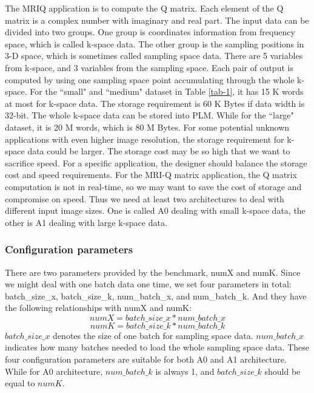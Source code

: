 \documentclass{sig-alternate}
\begin{document}
The MRIQ application is to compute the Q matrix. Each element of the Q matrix is a complex number with imaginary and real part. The input data can be divided into two groups. One group is coordinates information from frequency space, which is called k-space data. The other group is the sampling positions in 3-D space, which is sometimes called sampling space data. There are 5 variables from k-space, and 3 variables from the sampling space. Each pair of output is computed by using one sampling space point accumulating through the whole k-space. For the ``small" and ``medium" dataset in Table \ref{tab-1}, it has 15 K words at most for k-space data. The storage requirement is 60 K Bytes if data width is 32-bit. The whole k-space data can be stored into PLM. While for the ``large" dataset, it is 20 M words, which is 80 M Bytes. For some potential unknown applications with even higher image resolution, the storage requirement for k-space data could be larger. The storage cost may be so high that we want to sacrifice speed. For a specific application, the designer should balance the storage cost and speed requirements. For the MRI-Q matrix application, the Q matrix computation is not in real-time, so we may want to save the cost of storage and compromise on speed. Thus we need at least two architectures to deal with different input image sizes. One is called A0 dealing with small k-space data, the other is A1 dealing with large k-space data.\\



\subsubsection{Configuration parameters}

There are two parameters provided by the benchmark, numX and numK. Since we might deal with one batch data one time, we set four parameters in total: batch\_size\_x, batch\_size\_k, num\_batch\_x, and num\_batch\_k. And they have the following relationships with numX and numK:
    $$numX = batch\_size\_x * num\_batch\_x$$
    $$numK = batch\_size\_k * num\_batch\_k$$
$batch\_size\_x$ denotes the size of one batch for sampling space data. $num\_batch\_x$ indicates how many batches needed to load the whole sampling space data. These four configuration parameters are suitable for both A0 and A1 architecture. While for A0 architecture, $num\_batch\_k$ is always 1, and $batch\_size\_k$ should be equal to $numK$.\\
\end{document}
